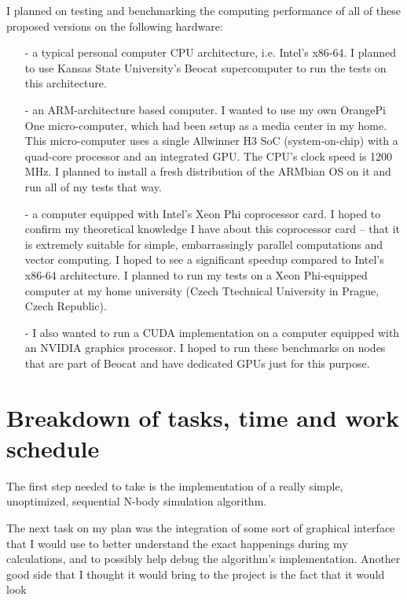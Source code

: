\documentclass[journal]{IEEEtran}
\begin{document}
		I planned on testing and benchmarking the computing performance of all of these proposed versions on the following hardware:
		\begin{itemize}  
			\item[-]{a typical personal computer CPU architecture, i.e. Intel’s x86-64. I planned to use Kansas State University’s Beocat supercomputer to run the tests on this architecture.}
			
			\item[-]{an ARM-architecture based computer. I wanted to use my own OrangePi One micro-computer, which had been  setup as a media center in my home. This micro-computer uses a single Allwinner H3 SoC (system-on-chip) with a quad-core processor and an integrated GPU. The CPU's clock speed is 1200 MHz. I planned to install a fresh distribution of the ARMbian OS on it and run all of my tests that way.}
			
			\item[-]{a computer equipped with Intel’s Xeon Phi coprocessor card. I hoped to confirm my theoretical knowledge I have about this coprocessor card – that it is extremely suitable for simple, embarrassingly parallel computations and vector computing. I hoped to see a significant speedup compared to Intel’s x86-64 architecture. I planned to run my tests on a Xeon Phi-equipped computer at my home university (Czech Ttechnical University in Prague, Czech Republic).}
			
			\item[-]{I also wanted to run a CUDA implementation on a computer equipped with an NVIDIA graphics processor. I hoped to run these benchmarks on nodes that are part of Beocat and have dedicated GPUs just for this purpose.}
		\end{itemize}
	
	\section{Breakdown of tasks, time and work schedule}
	
		The first step needed to take is the implementation of a really simple, unoptimized, sequential N-body simulation algorithm. 
		
		The next task on my plan was the integration of some sort of graphical interface that I would use to better understand the exact happenings during my calculations, and to possibly help debug the algorithm's implementation. Another good side that I thought it would bring to the project is the fact that it would look
		
\end{document}
